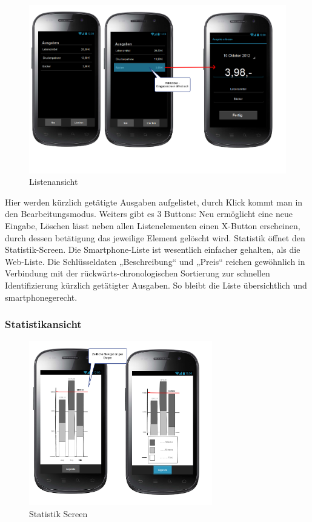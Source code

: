 \begin{figure}[htl]
\centering
\includegraphics[width=\textwidth]{img/Liste}
\caption{Listenansicht}
\label{fig:listen_ansicht}
\end{figure}

Hier werden kürzlich getätigte Ausgaben aufgelistet, durch Klick kommt man in den Bearbeitungsmodus. Weiters gibt es 3 Buttons: Neu ermöglicht eine neue Eingabe, Löschen lässt neben allen Listenelementen einen X-Button erscheinen, durch dessen betätigung das jeweilige Element gelöscht wird. Statistik öffnet den Statistik-Screen. Die Smartphone-Liste ist wesentlich einfacher gehalten, als die Web-Liste. Die Schlüsseldaten „Beschreibung“ und „Preis“ reichen gew\"ohnlich in Verbindung mit der rückwärts-chronologischen Sortierung zur schnellen Identifizierung kürzlich getätigter Ausgaben. So bleibt die Liste übersichtlich und smartphonegerecht.

\subsubsection{Statistikansicht}

\begin{figure}[htl]
\centering
\includegraphics[width=8cm]{img/Statistik}
\caption{Statistik Screen}
\label{fig:statistik_screen}
\end{figure}

